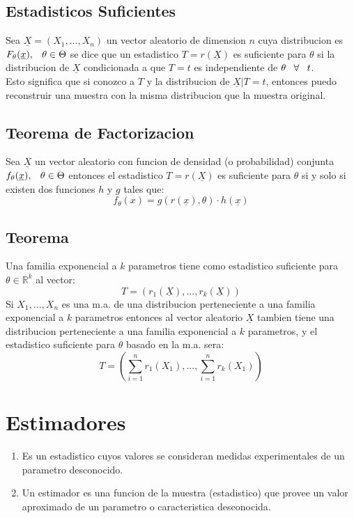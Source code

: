 \documentclass[titlepage,a4paper]{article}
\begin{document}
\subsection{Estadisticos Suficientes}
Sea $\underline{X} = (X_{1},...,X_{n})$ un vector aleatorio de dimension $n$ cuya distribucion es $F_{\theta}(\underline{x}), \hspace{8px} \theta \in \Theta$ se dice que un 
estadistico $T = r(\underline{X})$ es suficiente para $\theta$ si la distribucion de $\underline{X}$ condicionada a que $T=t$ es independiente de $\theta \hspace{8px} \forall \hspace{8px} t$.\\
Esto significa que si conozco a $T$ y la distribucion de $\underline{X}|T=t$, entonces puedo reconstruir una muestra con la misma distribucion que la muestra original.
\subsection{Teorema de Factorizacion}
Sea $\underline{X}$ un vector aleatorio con funcion de densidad (o probabilidad) conjunta $f_{\theta}(\underline{x}), \hspace{8px} \theta \in \Theta$ entonces el estadistico 
$T = r(\underline{X})$ es suficiente para $\theta$ si y solo si existen dos funciones $h$ y $g$ tales que:
\begin{equation*}
    f_{\theta}(x) = g(r(\underline{x}),\theta) \cdot h(\underline{x})
\end{equation*}
\subsection{Teorema}
Una familia exponencial a $k$ parametros tiene como estadistico suficiente para $\theta \in \mathbb{R}^{k}$ al vector:
\begin{equation*}
    T = (r_{1}(\underline{X}),...,r_{k}(\underline{X}))
\end{equation*}
Si $X_{1},...,X_{n}$ es una m.a. de una distribucion perteneciente a una familia exponencial a $k$ parametros entonces al vector aleatorio $\underline{X}$ tambien tiene una distribucion perteneciente a una familia exponencial a $k$ parametros, y el estadistico suficiente para $\theta$ basado en la m.a. sera:
\begin{equation*}
    T = (\sum_{i=1}^{n}r_{1}(X_{1}),...,\sum_{i=1}^{n}r_{k}(X_{1}))
\end{equation*} 
\section{Estimadores}
\begin{enumerate}
    \item Es un estadistico cuyos valores se consideran medidas experimentales de un parametro desconocido.
    \item Un estimador es una funcion de la muestra (estadistico) que provee un valor aproximado de un parametro o caracteristica desconocida.
\end{enumerate} 
\end{document}

